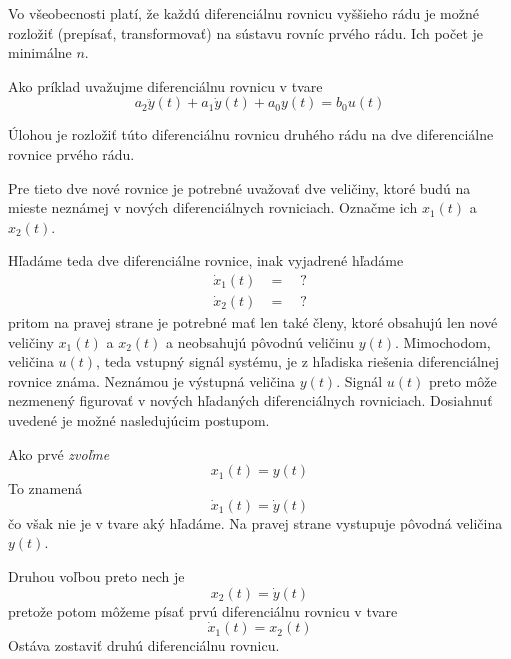 \documentclass[a4paper, 10pt, ]{article}
\begin{document}
Vo všeobecnosti platí, že každú diferenciálnu rovnicu vyššieho rádu je možné rozložiť (prepísať, transformovať) na sústavu rovníc prvého rádu. Ich počet je minimálne $n$.

Ako príklad uvažujme diferenciálnu rovnicu v tvare
\begin{equation} \label{povonadr2}
    a_2 \ddot y(t) + a_1 \dot y(t) + a_0 y(t) = b_0 u(t)
\end{equation}

Úlohou je rozložiť túto diferenciálnu rovnicu druhého rádu na dve diferenciálne rovnice prvého rádu.

Pre tieto dve nové rovnice je potrebné uvažovať dve veličiny, ktoré budú na mieste neznámej v nových diferenciálnych rovniciach. Označme ich $x_1(t)$ a $x_2(t)$.

Hľadáme teda dve diferenciálne rovnice, inak vyjadrené hľadáme
\begin{align*}
    \dot x_1(t) &= \quad ? \\
    \dot x_2(t) &= \quad ? 
\end{align*}
pritom na pravej strane je potrebné mať len také členy, ktoré obsahujú len nové veličiny $x_1(t)$ a $x_2(t)$ a neobsahujú pôvodnú veličinu $y(t)$. Mimochodom, veličina $u(t)$, teda vstupný signál systému, je z hľadiska riešenia diferenciálnej rovnice známa. Neznámou je výstupná veličina $y(t)$. Signál $u(t)$ preto môže nezmenený figurovať v nových hľadaných diferenciálnych rovniciach. Dosiahnuť uvedené je možné nasledujúcim postupom. 

Ako prvé \emph{zvoľme}
\begin{equation} \label{volba1}
    x_1(t) = y(t)
\end{equation}
To znamená
\begin{equation}
    \dot x_1(t) = \dot y(t)
\end{equation}
čo však nie je v tvare aký hľadáme. Na pravej strane vystupuje pôvodná veličina $y(t)$.

Druhou voľbou preto nech je
\begin{equation} \label{volba2}
    x_2(t) = \dot y(t)
\end{equation}
pretože potom môžeme písať prvú diferenciálnu rovnicu v tvare
\begin{equation}
    \dot x_1(t) = x_2(t)
\end{equation}
Ostáva zostaviť druhú diferenciálnu rovnicu. 
\end{document}
